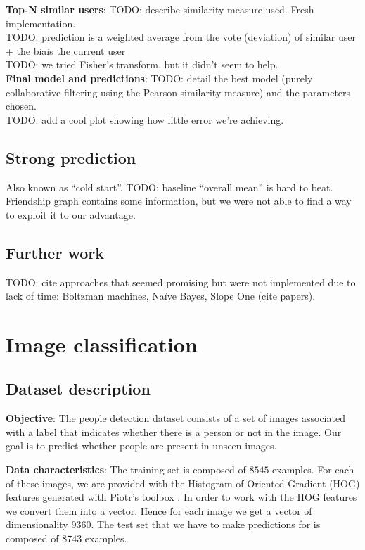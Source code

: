 \documentclass[10pt,a4paper]{article}
\begin{document}
    \noindent
    \textbf{Top-N similar users}:
    TODO: describe similarity measure used. Fresh implementation.\\
    TODO: prediction is a weighted average from the vote (deviation) of similar user + the biais the current user\\
    TODO: we tried Fisher's transform, but it didn't seem to help.\\

    \noindent
    \textbf{Final model and predictions}:
    TODO: detail the best model (purely collaborative filtering using the Pearson similarity measure) and the parameters chosen.\\
    TODO: add a cool plot showing how little error we're achieving.

  \subsection{Strong prediction}
  Also known as ``cold start''.
  TODO: baseline ``overall mean'' is hard to beat. Friendship graph contains some information, but we were not able to find a way to exploit it to our advantage.\\

  \subsection{Further work}
  TODO: cite approaches that seemed promising but were not implemented due to lack of time: Boltzman machines, Naïve Bayes, Slope One (cite papers).\\


\section{Image classification}

  \subsection{Dataset description}
  \textbf{Objective}: The people detection dataset consists of a set of images associated with a label that indicates whether there is a person or not in the image. Our goal is to predict whether people are present in unseen images.

  \textbf{Data characteristics}: The training set is composed of $8545$ examples. For each of these images, we are provided with the Histogram of Oriented Gradient (HOG) features generated with Piotr's toolbox \cite{piotrtoolbox}. In order to work with the HOG features we convert them into a vector. Hence for each image we get a vector of dimensionality $9360$. The test set that we have to make predictions for is composed of $8743$ examples.
\end{document}
